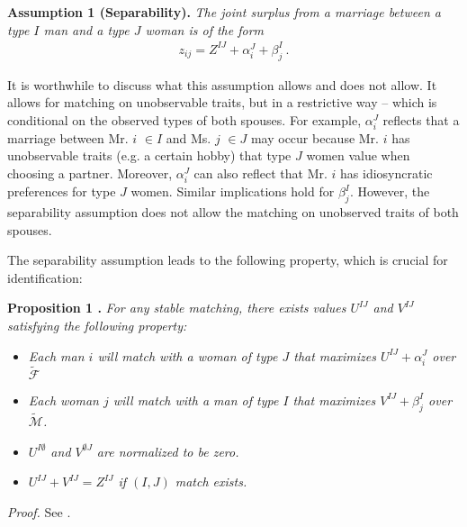  \vspace{2mm}
 \noindent\textbf{Assumption 1 (Separability).} \textit{The joint surplus from a marriage between a type $I$ man and a type $J$ woman is of the form}
 \begin{align}
 	z_{ij} = Z^{IJ} + \alpha^J_i + \beta^I_j \:.
 \end{align}
 
 
 It is worthwhile to discuss what this assumption allows and does not allow. It allows for matching on unobservable traits, but in a restrictive way -- which is conditional on the observed types of both spouses. For example, $\alpha^J_i$ reflects that a marriage between Mr. $i$ $\in I$ and Ms. $j$ $\in J$ may occur because Mr. $i$ has unobservable traits (e.g. a certain hobby) that type $J$ women value when choosing a partner. Moreover,  $\alpha^J_i$ can also reflect that Mr. $i$ has idiosyncratic preferences for type $J$ women. Similar implications hold for $\beta^I_j$. However, the separability assumption does not allow the matching on unobserved traits of both spouses.
 
The separability assumption leads to the following property, which is crucial for identification: 

 \vspace{2mm}
 \noindent\textbf{Proposition 1 \citep{ChooSiow_2006_WhoMarriesWhomandWhy, CSW_2018_MaritalCollegePremium}.} \textit{For any stable matching, there exists values $U^{IJ}$ and $V^{IJ}$ satisfying the following property:}
\begin{itemize}
	\item \textit{Each man $i$ will match with a woman of type $J$ that maximizes $U^{IJ} + \alpha^J_i$ over $\tilde{\mathcal{F}}$}
	\vspace{-1ex}
	\item \textit{Each woman $j$ will match with a man of type $I$ that maximizes $V^{IJ} + \beta^I_j$ over $\tilde{\mathcal{M}}$.}
	\vspace{-1ex}
	\item \textit{$U^{I\emptyset}$ and $V^{\emptyset J}$ are normalized to be zero.} 
	\vspace{-1ex}
	\item \textit{$U^{IJ} + V^{IJ} = Z^{IJ}$ if $(I,J)$ match exists.}
\end{itemize}
 \textit{Proof.} See \cite{CSW_2018_MaritalCollegePremium}.


